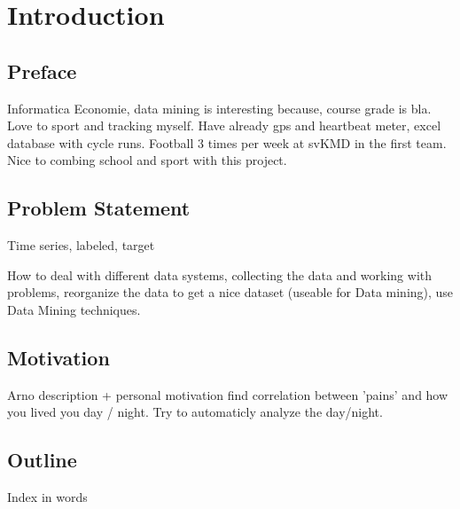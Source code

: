 \section{Introduction}
	\subsection{Preface}
		Informatica  Economie, data mining is interesting because, course grade is bla. Love to sport and tracking myself. Have already gps and heartbeat meter, excel database with cycle runs. Football 3 times per week at svKMD in the first team. Nice to combing school and sport with this project.

	\subsection{Problem Statement}
		Time series, labeled, target

		How to deal with different data systems, collecting the data and working with problems, reorganize the data to get a nice dataset (useable for Data mining), use Data Mining techniques.
	\subsection{Motivation}
		Arno description + personal motivation
		find correlation between 'pains' and how you lived you day / night. 
		Try to automaticly analyze the day/night.
				

	\subsection{Outline}
		Index in words
